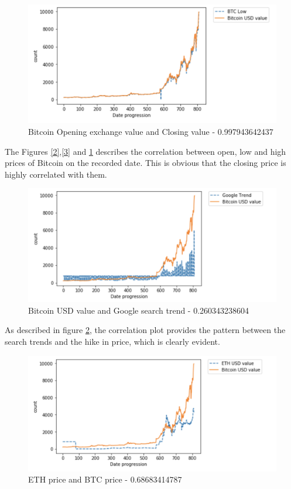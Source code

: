 \documentclass[sigconf]{acmart}
\begin{document}
\begin{figure}[!ht]
  \centering\includegraphics[width=\columnwidth]{images/low.png}
  \caption{Bitcoin Opening exchange value and Closing value - 0.997943642437}
  \label{4}
\end{figure}

The Figures \ref{2},\ref{3} and \ref{4} describes the correlation between open, low and high prices of Bitcoin on the recorded date. This is obvious that the closing price is highly correlated with them.

\begin{figure}[!ht]
  \centering\includegraphics[width=\columnwidth]{images/googletrend.png}
  \caption{Bitcoin USD value and Google search trend - 0.260343238604}
  \label{5}
\end{figure}

As described in figure \ref{5}, the correlation plot provides the pattern between the search trends and the hike in price, which is clearly evident.

\begin{figure}[!ht]
  \centering\includegraphics[width=\columnwidth]{images/ethvalue.png}
  \caption{ETH price and BTC price - 0.68683414787 }
  \label{6}
\end{figure}
\end{document}

